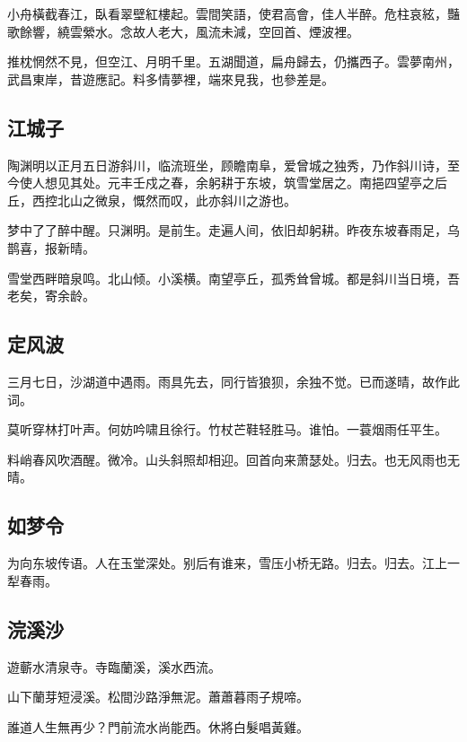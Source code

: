 \documentclass[a5paper]{ctexart}
\begin{document}
	小舟橫截春江，臥看翠壁紅樓起。雲間笑語，使君高會，佳人半醉。危柱哀絃，豔歌餘響，繞雲縈水。念故人老大，風流未減，空回首、煙波裡。
	
	推枕惘然不見，但空江、月明千里。五湖聞道，扁舟歸去，仍攜西子。雲夢南州，武昌東岸，昔遊應記。料多情夢裡，端來見我，也參差是。
	
	\subsection{江城子}
	\begin{small}
		陶渊明以正月五日游斜川，临流班坐，顾瞻南阜，爱曾城之独秀，乃作斜川诗，至今使人想见其处。元丰壬戍之春，余躬耕于东坡，筑雪堂居之。南挹四望亭之后丘，西控北山之微泉，慨然而叹，此亦斜川之游也。
	\end{small}
	
	梦中了了醉中醒。只渊明。是前生。走遍人间，依旧却躬耕。昨夜东坡春雨足，乌鹊喜，报新晴。　
	
	雪堂西畔暗泉鸣。北山倾。小溪横。南望亭丘，孤秀耸曾城。都是斜川当日境，吾老矣，寄余龄。　
	
	\subsection{定风波}
	\begin{small}
		三月七日，沙湖道中遇雨。雨具先去，同行皆狼狈，余独不觉。已而遂晴，故作此词。　
	\end{small}
	
	莫听穿林打叶声。何妨吟啸且徐行。竹杖芒鞋轻胜马。谁怕。一蓑烟雨任平生。　
	
	料峭春风吹酒醒。微冷。山头斜照却相迎。回首向来萧瑟处。归去。也无风雨也无晴。　
	
	\subsection{如梦令}
	为向东坡传语。人在玉堂深处。别后有谁来，雪压小桥无路。归去。归去。江上一犁春雨。
	
	\subsection{浣溪沙}
	\begin{small}
		遊蘄水清泉寺。寺臨蘭溪，溪水西流。
	\end{small}
	
	山下蘭芽短浸溪。松間沙路淨無泥。蕭蕭暮雨子規啼。
	
	誰道人生無再少？門前流水尚能西。休將白髮唱黃雞。
	
\end{document}
